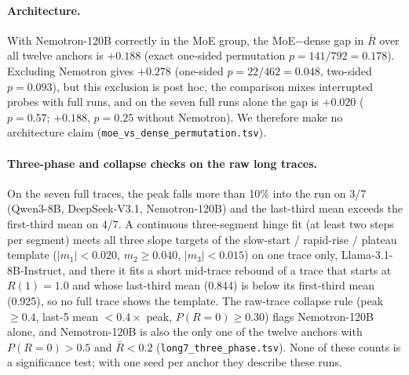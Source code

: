 \paragraph{Architecture.}
With Nemotron-120B correctly in the MoE group, the MoE$-$dense gap in
$\bar R$ over all twelve anchors is $+0.188$ (exact one-sided
permutation $p = 141/792 = 0.178$).  Excluding Nemotron gives $+0.278$
(one-sided $p = 22/462 = 0.048$, two-sided $p = 0.093$), but this
exclusion is post hoc, the comparison mixes interrupted probes with full
runs, and on the seven full runs alone the gap is $+0.020$ ($p = 0.57$;
$+0.188$, $p = 0.25$ without Nemotron).  We therefore make no
architecture claim (\texttt{moe\_vs\_dense\_permutation.tsv}).

\paragraph{Three-phase and collapse checks on the raw long traces.}
On the seven full traces, the peak falls more than 10\% into the run on
3/7 (Qwen3-8B, DeepSeek-V3.1, Nemotron-120B) and the last-third mean
exceeds the first-third mean on 4/7.  A continuous three-segment
hinge fit (at least two steps per segment) meets all three slope
targets of the slow-start / rapid-rise / plateau template
($|m_1| < 0.020$, $m_2 \ge 0.040$, $|m_3| < 0.015$) on one trace only,
Llama-3.1-8B-Instruct, and there it fits a short mid-trace rebound of a
trace that starts at $R(1)=1.0$ and whose last-third mean (0.844) is
below its first-third mean (0.925), so no full trace shows the template.  The raw-trace collapse rule (peak
$\ge 0.4$, last-5 mean $< 0.4\times$ peak, $P(R{=}0) \ge 0.30$) flags
Nemotron-120B alone, and Nemotron-120B is also the only one of the
twelve anchors with $P(R{=}0) > 0.5$ and $\bar R < 0.2$
(\texttt{long7\_three\_phase.tsv}).  None of these counts is a
significance test; with one seed per anchor they describe these runs.
